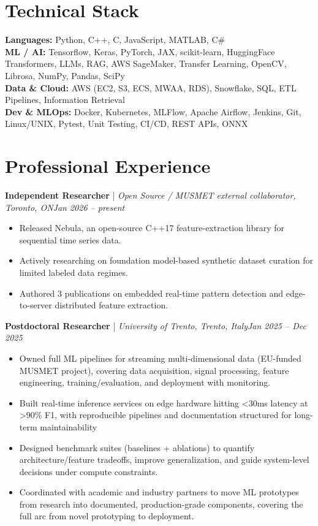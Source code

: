 \documentclass[11pt]{article}
\newenvironment{cvrole}[5]{%
  \par\noindent\textbf{\large #1} | \textit{\small #2, #3}\hfill \textit{\small #4 -- #5}\par
  \begin{itemize}[leftmargin=2em, itemsep=-0.3em, topsep=-0.5em]%
}{%
  \end{itemize}\par\noindent\mbox{}\par\vspace{0.1em}%
}
\begin{document}
\section*{Technical Stack}
\textbf{Languages:} Python, C++, C, JavaScript, MATLAB, C\#\\
\textbf{ML / AI:} Tensorflow, Keras, PyTorch, JAX, scikit-learn, HuggingFace Transformers, LLMs, RAG, AWS SageMaker, Transfer Learning, OpenCV, Librosa, NumPy, Pandas, SciPy\\
\textbf{Data \& Cloud:} AWS (EC2, S3, ECS, MWAA, RDS), Snowflake, SQL, ETL Pipelines, Information Retrieval\\
\textbf{Dev \& MLOps:} Docker, Kubernetes, MLFlow, Apache Airflow, Jenkins, Git, Linux/UNIX, Pytest, Unit Testing, CI/CD, REST APIs, ONNX

\section*{Professional Experience}
\begin{cvrole}{Independent Researcher}{Open Source / MUSMET external collaborator}{Toronto, ON}{Jan 2026}{present}
    \item Released Nebula, an open-source C++17 feature-extraction library for sequential time series data.
    \item Actively researching on foundation model-based synthetic dataset curation for limited labeled data regimes.
    \item Authored 3 publications on embedded real-time pattern detection and edge-to-server distributed feature extraction.
\end{cvrole}

\begin{cvrole}{Postdoctoral Researcher}{University of Trento}{Trento, Italy}{Jan 2025}{Dec 2025}
    \item Owned full ML pipelines for streaming multi-dimensional data (EU-funded MUSMET project), covering data acquisition, signal processing, feature engineering, training/evaluation, and deployment with monitoring.
    \item Built real-time inference services on edge hardware hitting <30ms latency at >90\% F1, with reproducible pipelines and documentation structured for long-term maintainability
    \item Designed benchmark suites (baselines + ablations) to quantify architecture/feature tradeoffs, improve generalization, and guide system-level decisions under compute constraints.
    \item Coordinated with academic and industry partners to move ML prototypes from research into documented, production-grade components, covering the full arc from novel prototyping to deployment.
\end{cvrole}
\end{document}
